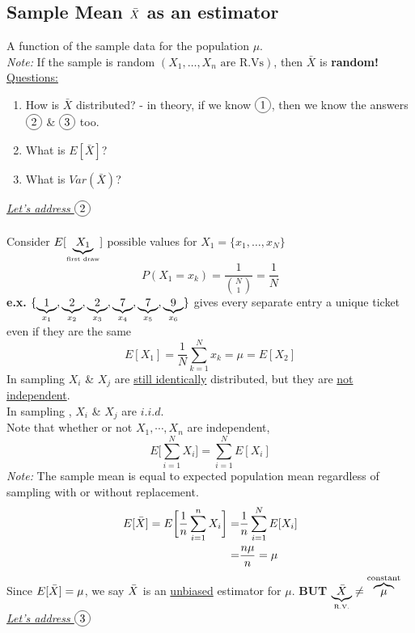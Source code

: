 \subsection*{Sample Mean $\bar{X}$ as an estimator}
A function of the sample data for the population $\mu$.\\
\emph{Note: } If the sample is random $(X_1, \ldots, X_n \text{ are R.Vs})$, then $\bar{X}$ is \textbf{random!}\\
\underline{Questions:} 
\begin{enumerate}[label=\protect\circled{\arabic*}]
	\item How is $\bar{X}$ distributed? - in theory, if we know $\circled{1}$, then we know the answers $\circled{2}$ \& $\circled{3}$ too.
	\item What is $E[\bar{X}]$?
	\item What is $Var(\bar{X})$?
\end{enumerate}
\underline{\textit{Let's address $\circled{2}$}}\\\\
\qquad Consider $E[\underbrace{X_1}_{\text{\tiny first draw}}]$ \qquad \qquad \hspace{5em} possible values for $X_1 = \{x_1, \ldots, x_N\}$
\begin{equation*}
	P(X_1 = x_k) = \frac{1}{\binom{N}{1}} = \frac{1}{N}
\end{equation*}
\textbf{e.x.} $\{\underbrace{1}_{\tiny x_1},\underbrace{2}_{\tiny x_2},\underbrace{2}_{\tiny x_3},\underbrace{7}_{\tiny x_4},\underbrace{7}_{\tiny x_5},\underbrace{9}_{\tiny x_6} \}$ \hspace{2em} {\scriptsize gives every separate entry a unique ticket even if they are the same}
\begin{equation*}
	E[X_1] = \frac{1}{N} \sum\limits_{k=1}^N x_k = \mu = E[X_2] \tag{b/c $X_1$ \& $X_2$ are identically dist.}
\end{equation*}
In sampling  $X_i$ \& $X_j$ are \underline{still identically} distributed, but they are \underline{not independent}.\\
In sampling , $X_i$ \& $X_j$ are $i.i.d.$\\
Note that whether or not $X_1, \cdots, X_n$ are independent, 
\begin{equation*}
	E\bigg[\sum\limits_{i=1}^N X_i\bigg] = \sum\limits_{i=1}^N E[X_i]
\end{equation*}
\emph{Note:} The sample mean is equal to expected population mean regardless of sampling with or without replacement.
\begin{align*}
	E[\bar{X}] = E\bigg[\frac{1}{n} \sum\limits_{i=1}^n X_i \bigg] = & \frac{1}{n} \sum\limits_{i=1}^N E[X_i]\\
	= & \frac{n\mu}{n} = \mu 
\end{align*}
Since $E[\bar{X}] = \mu$, we say $\bar{X}$ is an \underline{unbiased} estimator for $\mu$. \qquad \textbf{BUT} $\underbrace{\bar{X}}_{\text{\tiny R.V.}} \neq \overbrace{\mu}^{\text{constant}}$\\
\underline{\textit{Let's address $\circled{3}$}}

